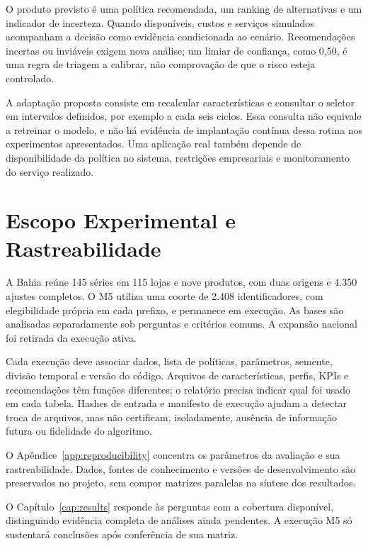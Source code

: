 O produto previsto é uma política recomendada, um ranking de alternativas e um indicador de incerteza. Quando disponíveis, custos e serviços simulados acompanham a decisão como evidência condicionada ao cenário. Recomendações incertas ou inviáveis exigem nova análise; um limiar de confiança, como 0,50, é uma regra de triagem a calibrar, não comprovação de que o risco esteja controlado.

A adaptação proposta consiste em recalcular características e consultar o seletor em intervalos definidos, por exemplo a cada seis ciclos. Essa consulta não equivale a retreinar o modelo, e não há evidência de implantação contínua dessa rotina nos experimentos apresentados. Uma aplicação real também depende de disponibilidade da política no sistema, restrições empresariais e monitoramento do serviço realizado.

\section{Escopo Experimental e Rastreabilidade}
\label{sec:protocolo_exp}
\label{sec:reporting}

A Bahia reúne 145 séries em 115 lojas e nove produtos, com duas origens e 4.350 ajustes completos. O M5 utiliza uma coorte de 2.408 identificadores, com elegibilidade própria em cada prefixo, e permanece em execução. As bases são analisadas separadamente sob perguntas e critérios comuns. A expansão nacional foi retirada da execução ativa.

Cada execução deve associar dados, lista de políticas, parâmetros, semente, divisão temporal e versão do código. Arquivos de características, perfis, KPIs e recomendações têm funções diferentes; o relatório precisa indicar qual foi usado em cada tabela. Hashes de entrada e manifesto de execução ajudam a detectar troca de arquivos, mas não certificam, isoladamente, ausência de informação futura ou fidelidade do algoritmo.

O Apêndice~\ref{app:reproducibility} concentra os parâmetros da avaliação e sua rastreabilidade. Dados, fontes de conhecimento e versões de desenvolvimento são preservados no projeto, sem compor matrizes paralelas na síntese dos resultados.

O Capítulo~\ref{cap:results} responde às perguntas com a cobertura disponível, distinguindo evidência completa de análises ainda pendentes. A execução M5 só sustentará conclusões após conferência de sua matriz.